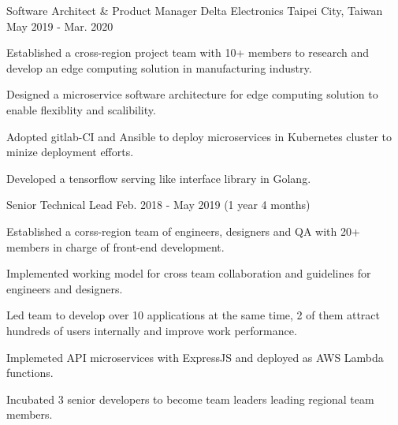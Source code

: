 \begin{cventries}
  \cventry
    {Software Architect \& Product Manager} %
    {Delta Electronics} %
    {Taipei City, Taiwan} %
    {May 2019 - Mar. 2020} %
    {
      \begin{cvitems} %
        \item {Established a cross-region project team with 10+ members to research and develop an edge computing solution in manufacturing industry.}
        \item {Designed a microservice software architecture for edge computing solution to enable flexiblity and scalibility.}
        \item {Adopted gitlab-CI and Ansible to deploy microservices in Kubernetes cluster to minize deployment efforts.}
        \item {Developed a tensorflow serving like interface library in Golang.}
      \end{cvitems}
    }

  \cventry
    {Senior Technical Lead} %
    {} %
    {} %
    {Feb. 2018 - May 2019 (1 year 4 months)} %
    {
      \begin{cvitems} %
        \item {Established a corss-region team of engineers, designers and QA with 20+ members in charge of front-end development.}
        \item {Implemented working model for cross team collaboration and guidelines for engineers and designers.}
        \item {Led team to develop over 10 applications at the same time, 2 of them attract hundreds of users internally and improve work performance.}
        \item {Implemeted API microservices with ExpressJS and deployed as AWS Lambda functions.}
        \item {Incubated 3 senior developers to become team leaders leading regional team members.}
      \end{cvitems}
    }


\end{cventries}
